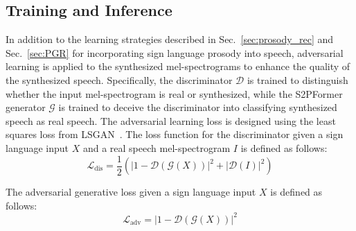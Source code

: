 \subsection{Training and Inference}
\label{sec:training_and_inference}
In addition to the learning strategies described in Sec.~\ref{sec:prosody_rec} and Sec.~\ref{sec:PGR} for incorporating sign language prosody into speech, adversarial learning is applied to the synthesized mel-spectrograms to enhance the quality of the synthesized speech. Specifically, the discriminator $\mathcal{D}$ is trained to distinguish whether the input mel-spectrogram is real or synthesized, while the S2PFormer generator $\mathcal{G}$ is trained to deceive the discriminator into classifying synthesized speech as real speech. The adversarial learning loss is designed using the least squares loss from LSGAN~\cite{Mao_2017_ICCV}.
The loss function for the discriminator given a sign language input $X$ and a real speech mel-spectrogram $I$ is defined as follows:
\begin{equation}
    \mathcal{L}_{\mathrm{dis}} = \frac{1}{2}\left(|1 - \mathcal{D}(\mathcal{G}(X))|^2 + |\mathcal{D}(I)|^2\right)
\end{equation}

The adversarial generative loss given a sign language input $X$ is defined as follows:
\begin{equation}
    \mathcal{L}_{\mathrm{adv}} = |1 - \mathcal{D}(\mathcal{G}(X))|^2
\end{equation}

